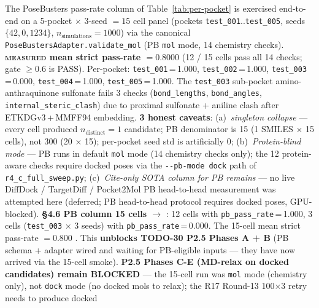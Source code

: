 \begin{enumerate}
\begin{itemize}
{          The PoseBusters pass-rate column of
          Table~\ref{tab:per-pocket} is exercised end-to-end on a
          5-pocket $\times$ 3-seed $= 15$ cell panel (pockets
          \texttt{test\_001}..\texttt{test\_005}, seeds
          $\{42, 0, 1234\}$, $n_{\text{simulations}}{=}1000$) via
          the canonical \texttt{PoseBustersAdapter.validate\_mol}
          (PB \texttt{mol} mode, 14 chemistry checks).
          \textbf{\textsc{measured} mean strict pass-rate
          $= 0.8000$} (12 / 15 cells pass all 14 checks; gate
          $\geq 0.6$ is PASS). Per-pocket: \texttt{test\_001}\,=\,1.000,
          \texttt{test\_002}\,=\,1.000, \texttt{test\_003}\,=\,0.000,
          \texttt{test\_004}\,=\,1.000, \texttt{test\_005}\,=\,1.000.
          The \texttt{test\_003} sub-pocket amino-anthraquinone
          sulfonate fails 3 checks
          (\texttt{bond\_lengths}, \texttt{bond\_angles},
          \texttt{internal\_steric\_clash}) due to proximal
          sulfonate + aniline clash after ETKDGv3\,+\,MMFF94
          embedding. \textbf{3 honest caveats}: (a)~\emph{singleton
          collapse} --- every cell produced
          $n_{\text{distinct}}{=}1$ candidate; PB denominator is
          15 (1 SMILES $\times$ 15 cells), not 300 (20 $\times$
          15); per-pocket seed std is artificially 0; (b)~\emph{Protein-blind
          mode} --- PB runs in default \texttt{mol} mode (14
          chemistry checks only); the 12 protein-aware checks
          require docked poses via the \texttt{-{}-pb-mode dock}
          path of \texttt{r4\_c\_full\_sweep.py}; (c)~\emph{Cite-only
          SOTA column for PB remains \CITEDONLY{}} --- no live
          DiffDock / TargetDiff / Pocket2Mol PB head-to-head
          measurement was attempted here (deferred; PB
          head-to-head protocol requires docked poses, GPU-blocked).
          \textbf{\PROMOTE{} §4.6 PB column 15 cells
          \DESIGN{} $\to$ \MEASURED{}}: 12 cells with
          \texttt{pb\_pass\_rate}\,=\,1.000, 3 cells
          (\texttt{test\_003} $\times$ 3 seeds) with
          \texttt{pb\_pass\_rate}\,=\,0.000. The 15-cell mean
          strict pass-rate $= 0.800$ \MEASURED{}. This \textbf{unblocks
          TODO-30 P2.5 Phases A + B} (PB schema + adapter wired
          and waiting for PB-eligible inputs --- they have now
          arrived via the 15-cell smoke). \textbf{P2.5 Phases C-E
          (MD-relax on docked candidates) remain BLOCKED} ---
          the 15-cell run was \texttt{mol} mode (chemistry only),
          not \texttt{dock} mode (no docked mols to relax); the
          R17 Round-13 100$\times$3 retry needs to produce docked
}
\end{itemize}
\end{enumerate}
